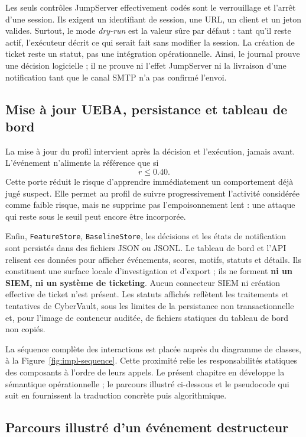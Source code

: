 \documentclass[11pt,a4paper,oneside]{report}
\theoremstyle{definition}
\theoremstyle{plain}
\begin{document}
Les seuls contrôles JumpServer effectivement codés sont le verrouillage et
l'arrêt d'une session. Ils exigent un identifiant de session, une URL, un
client et un jeton valides. Surtout, le mode \emph{dry-run} est la valeur sûre
par défaut : tant qu'il reste actif, l'exécuteur décrit ce qui serait fait sans
modifier la session. La création de ticket
reste un statut, pas une intégration opérationnelle. Ainsi, le journal prouve
une décision logicielle ; il ne prouve ni l'effet JumpServer ni la livraison
d'une notification tant que le canal SMTP n'a pas confirmé l'envoi.

\subsection{Mise à jour UEBA, persistance et tableau de bord}

La mise à jour du profil intervient après la décision et l'exécution, jamais
avant. L'événement n'alimente la référence que si
\[
 r\leq 0.40.
\]
Cette porte réduit le risque d'apprendre immédiatement un comportement déjà
jugé suspect. Elle permet au profil de suivre progressivement l'activité
considérée comme faible risque, mais ne supprime pas l'empoisonnement lent :
une attaque qui reste sous le seuil peut encore être incorporée.

Enfin, \texttt{FeatureStore}, \texttt{BaselineStore}, les décisions et les
états de notification sont persistés dans des fichiers JSON ou JSONL. Le
tableau de bord et l'API relisent ces données pour afficher événements,
scores, motifs, statuts et détails. Ils constituent une surface locale
d'investigation et d'export ; ils ne forment \textbf{ni un SIEM, ni un
système de ticketing}. Aucun connecteur SIEM ni création effective de ticket
n'est présent. Les statuts affichés reflètent les traitements et tentatives
de CyberVault, sous les limites de la persistance non transactionnelle et,
pour l'image de conteneur auditée, de fichiers statiques du tableau de bord
non copiés.

La séquence complète des interactions est placée auprès du diagramme de
classes, à la Figure~\ref{fig:impl-sequence}. Cette proximité relie les
responsabilités statiques des composants à l'ordre de leurs appels. Le présent
chapitre en développe la sémantique opérationnelle ; le parcours illustré
ci-dessous et le pseudocode qui suit en fournissent la traduction concrète
puis algorithmique.

\subsection{Parcours illustré d'un événement destructeur}
\end{document}
